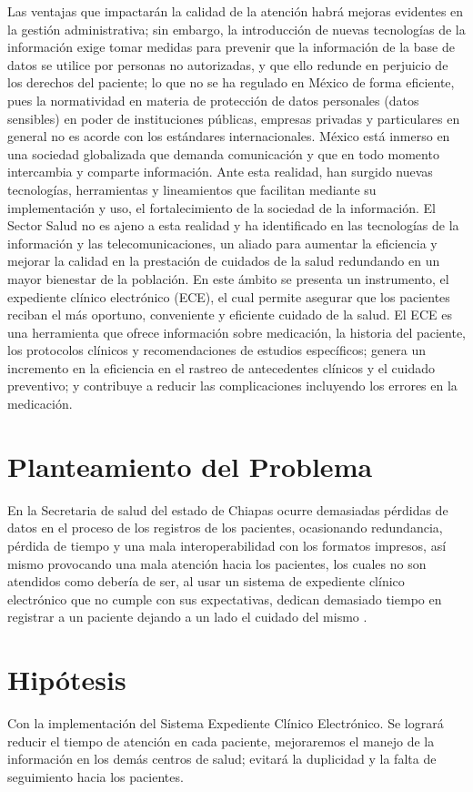 Las ventajas que impactarán la calidad de la atención habrá mejoras evidentes en la gestión administrativa; sin embargo, la introducción de nuevas tecnologías de la información exige tomar medidas para prevenir que la información de la base de datos se utilice por personas no autorizadas, y que ello redunde en perjuicio de los derechos del paciente; lo que no se ha regulado en México de forma eficiente, pues la normatividad en materia de protección de datos personales (datos sensibles) en poder de instituciones públicas, empresas privadas y particulares en general no es acorde con los estándares internacionales. México está inmerso en una sociedad globalizada que demanda comunicación y que en todo momento intercambia y comparte información. Ante esta realidad, han surgido nuevas tecnologías, herramientas y lineamientos que facilitan mediante su implementación y uso, el fortalecimiento de la sociedad de la información. El Sector Salud no es ajeno a esta realidad y ha identificado en las tecnologías de la información y las telecomunicaciones, un aliado para aumentar la eficiencia y mejorar la calidad en la prestación de cuidados de la salud redundando en un mayor bienestar de la población. En este ámbito se presenta un instrumento, el expediente clínico electrónico (ECE), el cual permite asegurar que los pacientes reciban el más oportuno, conveniente y eficiente cuidado de la salud. El ECE es una herramienta que ofrece información sobre medicación, la historia del paciente, los protocolos clínicos y recomendaciones de estudios específicos; genera un incremento en la eficiencia en el rastreo de antecedentes clínicos y el cuidado preventivo; y contribuye a reducir las complicaciones incluyendo los errores en la medicación.


\section{Planteamiento del Problema}
En la Secretaria de salud del estado de Chiapas ocurre demasiadas pérdidas de datos en el proceso de los registros de los pacientes, ocasionando redundancia, pérdida de tiempo y una mala interoperabilidad con los formatos impresos, así mismo provocando una mala atención hacia los pacientes, los cuales no son atendidos como debería de ser, al usar un sistema de expediente clínico electrónico que no cumple con sus expectativas, dedican demasiado tiempo en registrar a un paciente dejando a un  lado el cuidado del mismo .

\section{Hipótesis}
Con la implementación del Sistema Expediente Clínico Electrónico. Se logrará reducir el tiempo de atención en cada paciente, mejoraremos el manejo de la información en los demás centros de salud; evitará la duplicidad y la falta de seguimiento hacia los pacientes.

